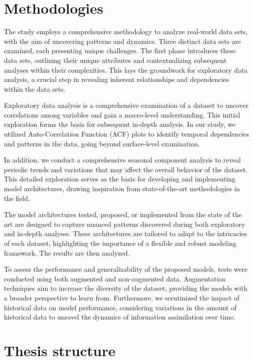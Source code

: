 \section*{Methodologies}

The study employs a comprehensive methodology to analyze real-world data sets, with the aim of uncovering patterns and dynamics. Three distinct data sets are examined, each presenting unique challenges. The first phase introduces these data sets, outlining their unique attributes and contextualizing subsequent analyses within their complexities. This lays the groundwork for exploratory data analysis, a crucial step in revealing inherent relationships and dependencies within the data sets.

Exploratory data analysis is a comprehensive examination of a dataset to uncover correlations among variables and gain a macro-level understanding. This initial exploration forms the basis for subsequent in-depth analysis. In our study, we utilized Auto-Correlation Function (ACF) plots to identify temporal dependencies and patterns in the data, going beyond surface-level examination.

In addition, we conduct a comprehensive seasonal component analysis to reveal periodic trends and variations that may affect the overall behavior of the dataset. This detailed exploration serves as the basis for developing and implementing model architectures, drawing inspiration from state-of-the-art methodologies in the field.

The model architectures tested, proposed, or implemented from the state of the art are designed to capture nuanced patterns discovered during both exploratory and in-depth analyses. These architectures are tailored to adapt to the intricacies of each dataset, highlighting the importance of a flexible and robust modeling framework. The results are then analyzed.

To assess the performance and generalizability of the proposed models, tests were conducted using both augmented and non-augmented data. Augmentation techniques aim to increase the diversity of the dataset, providing the models with a broader perspective to learn from. Furthermore, we scrutinized the impact of historical data on model performance, considering variations in the amount of historical data to unravel the dynamics of information assimilation over time.

\section*{Thesis structure}

